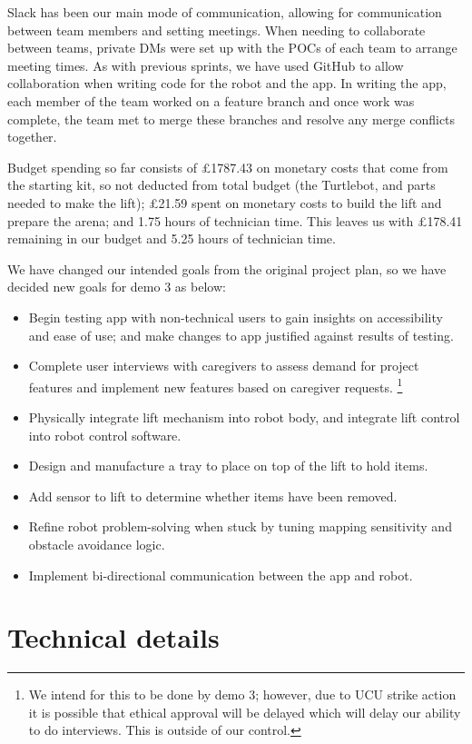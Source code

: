 \documentclass{article}
\begin{document}
Slack has been our main mode of communication, allowing for communication between team members and setting meetings. When needing to collaborate between teams, private DMs were set up with the POCs of each team to arrange meeting times. As with previous sprints, we have used GitHub to allow collaboration when writing code for the robot and the app. In writing the app, each member of the team worked on a feature branch and once work was complete, the team met to merge these branches and resolve any merge conflicts together. 

Budget spending so far consists of \pounds 1787.43 on monetary costs that come from the starting kit, so not deducted from total budget (the Turtlebot, and parts needed to make the lift); \pounds 21.59 spent on monetary costs to build the lift and prepare the arena; and 1.75 hours of technician time. This leaves us with \pounds 178.41 remaining in our budget and 5.25 hours of technician time. 

We have changed our intended goals from the original project plan, so we have decided new goals for demo 3 as below:
\begin{itemize}
\item Begin testing app with non-technical users to gain insights on accessibility and ease of use; and make changes to app justified against results of testing.
\item Complete user interviews with caregivers to assess demand for project features and implement new features based on caregiver requests. \footnote{We intend for this to be done by demo 3; however, due to UCU strike action it is possible that ethical approval will be delayed which will delay our ability to do interviews. This is outside of our control.}
\item Physically integrate lift mechanism into robot body, and integrate lift control into robot control software.
\item Design and manufacture a tray to place on top of the lift to hold items.
\item Add sensor to lift to determine whether items have been removed. 
\item Refine robot problem-solving when stuck by tuning mapping sensitivity and obstacle avoidance logic.
\item Implement bi-directional communication between the app and robot.
\end{itemize}

\section{Technical details}
\end{document}
